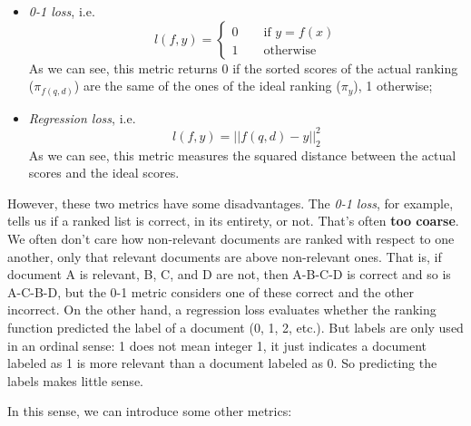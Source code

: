 \begin{itemize}
    \item \textit{0-1 loss}, i.e.
    $$
    l(f,y) = \begin{cases}
	0 \qquad \text{if } y = f(x)\\
	1 \qquad \text{otherwise} 
	\end{cases}
    $$
    As we can see, this metric returns 0 if the sorted scores of the actual ranking ($\pi_{f(q,d)}$) are the same of the ones of the ideal ranking ($\pi_y$), 1 otherwise;
    \item \textit{Regression loss}, i.e.
    $$
    l(f,y) = ||f(q,d) - y||_2^2
    $$
    As we can see, this metric measures the squared distance between the actual scores and the ideal scores.
\end{itemize}

However, these two metrics have some disadvantages. The \textit{0-1 loss}, for example, tells us if a ranked list is correct, in its entirety, or not. That's often \textbf{too coarse}. We often don't care how non-relevant documents are ranked with respect to one another, only that relevant documents are above non-relevant ones. That is, if document A is relevant, B, C, and D are not, then A-B-C-D is correct and so is A-C-B-D, but the 0-1 metric considers one of these correct and the other incorrect. On the other hand, a regression loss evaluates whether the ranking function predicted the label of a document (0, 1, 2, etc.). But labels are only used in an ordinal sense: 1 does not mean integer 1, it just indicates a document labeled as 1 is more relevant than a document labeled as 0. So predicting the labels makes little sense.

In this sense, we can introduce some other metrics:

